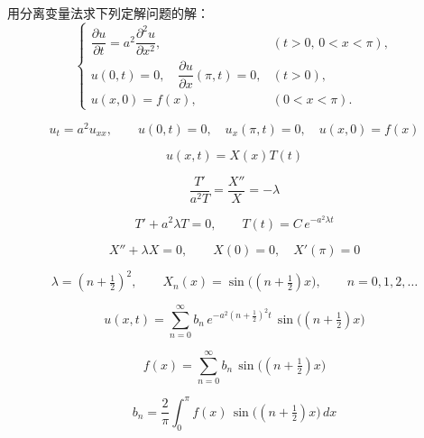 \begin{homework}[1]
用分离变量法求下列定解问题的解：
\[
\begin{cases}
\dfrac{\partial u}{\partial t}
= a^2\dfrac{\partial^2 u}{\partial x^2}, & (t>0,\,0<x<\pi),\\[6pt]
u(0,t)=0, \quad \dfrac{\partial u}{\partial x}(\pi,t)=0, & (t>0),\\[6pt]
u(x,0)=f(x), & (0<x<\pi).
\end{cases}
\]
\end{homework}
\begin{solution}
\[
u_t=a^2u_{xx},\qquad u(0,t)=0,\quad u_x(\pi,t)=0,\quad u(x,0)=f(x)
\]

\[
u(x,t)=X(x)T(t)
\]

\[
\frac{T'}{a^2T}=\frac{X''}{X}=-\lambda
\]

\[
T'+a^2\lambda T=0,\qquad T(t)=C\,e^{-a^2\lambda t}
\]

\[
X''+\lambda X=0,\qquad X(0)=0,\quad X'(\pi)=0
\]

\[
\lambda=(n+\tfrac12)^2,\qquad X_n(x)=\sin\!\big((n+\tfrac12)x\big),\qquad n=0,1,2,\ldots
\]

\[
u(x,t)=\sum_{n=0}^{\infty}b_n\,e^{-a^2(n+\frac12)^2t}\,\sin\!\big((n+\tfrac12)x\big)
\]

\[
f(x)=\sum_{n=0}^{\infty}b_n\,\sin\!\big((n+\tfrac12)x\big)
\]

\[
b_n=\frac{2}{\pi}\int_0^{\pi}f(x)\,\sin\!\big((n+\tfrac12)x\big)\,dx
\]
\end{solution}







